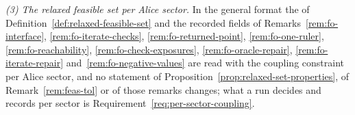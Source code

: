 \begin{remark}
\emph{(3) The relaxed feasible set per Alice sector.} In the general format
the  of Definition~\ref{def:relaxed-feasible-set}
and the recorded fields of Remarks~\ref{rem:fo-interface},
\ref{rem:fo-iterate-checks}, \ref{rem:fo-returned-point},
\ref{rem:fo-one-ruler}, \ref{rem:fo-reachability},
\ref{rem:fo-check-exposures}, \ref{rem:fo-oracle-repair},
\ref{rem:fo-iterate-repair} and~\ref{rem:fo-negative-values} are read with the
coupling constraint per Alice sector, and no statement of
Proposition~\ref{prop:relaxed-set-properties}, of
Remark~\ref{rem:feas-tol} or of those remarks changes;
what a run decides and records per sector is
Requirement~\ref{req:per-sector-coupling}.
\end{remark}
